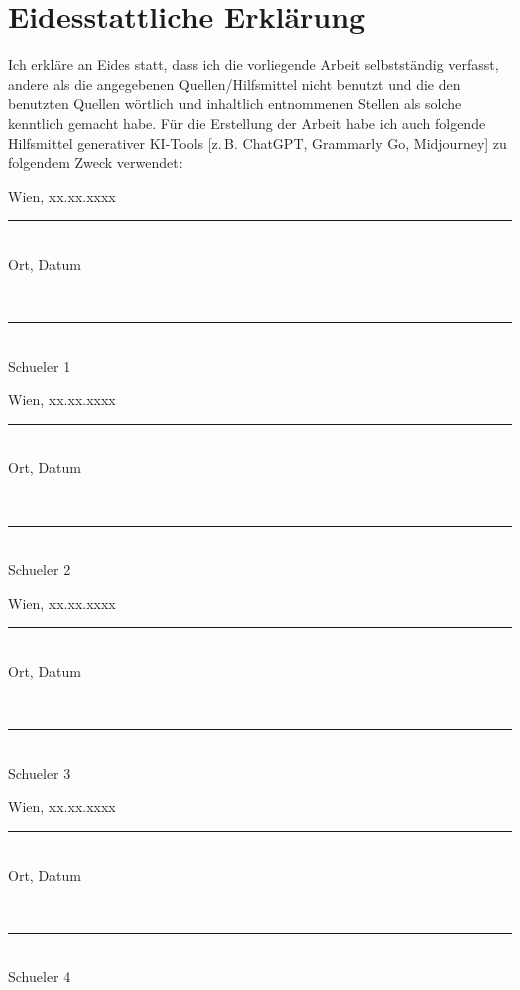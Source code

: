 
\newcommand{\signatureline}[2]{%
    \begin{minipage}[t]{0.4\textwidth}
        \vspace{0.8cm}
        \centering
        #1 %
        \vspace{0.1cm}\\
        \rule{6cm}{0.4pt}\\
        \vspace{0.05cm}
        Ort, Datum %
    \end{minipage}
    \hfill
    \begin{minipage}[t]{0.4\textwidth}
        \vspace{0.8cm}
        \centering
        \phantom{#1} %
        \vspace{0.1cm}\\
        \rule{6cm}{0.4pt}\\
        \vspace{0.05cm}
        #2 %
    \end{minipage}
}

\chapter*{Eidesstattliche Erklärung}

Ich erkläre an Eides statt, dass ich die vorliegende Arbeit selbstständig verfasst, andere als die angegebenen Quellen/Hilfsmittel nicht benutzt und die den benutzten Quellen wörtlich und inhaltlich entnommenen Stellen als solche kenntlich gemacht habe. Für die Erstellung der Arbeit habe ich auch folgende Hilfsmittel generativer KI-Tools [z.\,B. ChatGPT, Grammarly Go, Midjourney] zu folgendem Zweck verwendet:
\vspace{1.5cm}

\signatureline{Wien, xx.xx.xxxx}{Schueler 1}

\vspace{0.8cm}

\signatureline{Wien, xx.xx.xxxx}{Schueler 2}

\vspace{0.8cm}

\signatureline{Wien, xx.xx.xxxx}{Schueler 3}

\vspace{0.8cm}

\signatureline{Wien, xx.xx.xxxx}{Schueler 4}